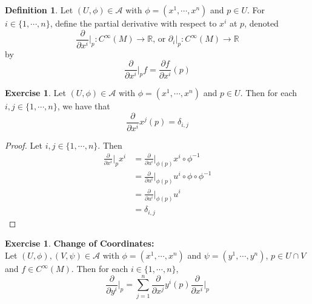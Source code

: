 \documentclass{book}
\theoremstyle{definition}
\newtheorem{defn}[definition]{Definition}
\newtheorem{ex}[definition]{Exercise}
\newcommand{\del}{\delta}
\newcommand{\R}{\mathbb{R}}
\newcommand{\MA}{\mathcal{A}}
\newcommand{\MN}{\mathcal{N}}
\DeclareMathOperator*{\0}{\mbf{0}}
\DeclareMathOperator*{\1}{\mbf{1}}
\newcommand{\tbf}[1]{\textbf{#1}}
\newcommand{\p}{\partial}
\begin{document}

	\begin{defn}
		Let $(U, \phi) \in \MA$ with $\phi = (x^1, \cdots, x^n)$ and $p \in U$. For $i \in \{1, \cdots, n\}$, define the partial derivative with respect to $x^i$ at $p$, denoted $$\frac{\p}{\p x^i} \bigg|_p: C^{\infty}(M) \rightarrow \R  \text{, or } \p_i|_p: C^{\infty}(M) \rightarrow \R $$ by $$ \frac{\p}{\p x^i} \bigg |_p  f =  \frac{\p f}{\p x^i}(p) $$
	\end{defn}

	\begin{ex}
		Let $(U, \phi) \in \MA$ with $\phi = (x^1, \cdots, x^n)$ and $p \in U$. Then for each $i,j \in \{1, \cdots, n\}$, we have that $${\frac{\p}{\p x^i}{x^j}}(p) = \del_{i,j}$$
	\end{ex}

	\begin{proof}
		Let $i,j \in \{1, \cdots, n\}$. Then 
		\begin{align*}
			\frac{\p}{\p x^i} \bigg|_p x^i 
			&=  \frac{\p}{\p u^i} \bigg|_{\phi(p)} x^i \circ \phi^{-1} \\
			&= \frac{\p}{\p u^i} \bigg|_{\phi(p)} u^i \circ \phi \circ \phi^{-1} \\
			&= \frac{\p}{\p u^i} \bigg|_{\phi(p)} u^i  \\
			&= \del_{i,j}
		\end{align*}
	\end{proof}

	\begin{ex} \tbf{Change of Coordinates:}\\
		Let $(U, \phi), (V, \psi) \in \MA$ with $\phi = (x^1, \cdots, x^n)$ and $\psi = (y^1, \cdots, y^n)$, $p \in U \cap V$ and $f \in C^{\infty}(M)$. Then for each $i \in \{1, \cdots, n\}$, 
		 $$\frac{\p}{\p y^i} \bigg|_p = \sum_{j =1}^n {\frac{\p}{\p x^j}{y^i}}(p) \frac{\p}{\p x^i} \bigg|_p    $$
	\end{ex}
\end{document}
